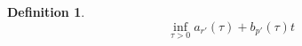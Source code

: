 \documentclass[preprint,11pt]{elsarticle}
\newtheorem{definition}{Definition}[section]
\numberwithin{equation}{section}
\begin{document}
\begin{definition}
\begin{equation}
			\inf _{\tau >0}a_{r' }\left ( \tau  \right ) +b_{p' }\left ( \tau  \right )t                                                                                                                                                                                                                                                                                                                                                                                                                                                                                                                                                                                                                                                                                                                                                                                                                                                                                                                                                                                                                                                                                                                                                                                                                                                                                                                                                                                                                                                                                                                                                                                                                                                                                                                                                                                                                                                                                                                                                                                                                                                                                                                                                                                                                                                                                                                                                                                                                                                                                                                                                                                                                                                                                                                                                                                                                                                                                                                                                                                                                                                                                                                                                                                                                                                                                                                                                     
\end{equation}
\end{definition}
\end{document}
